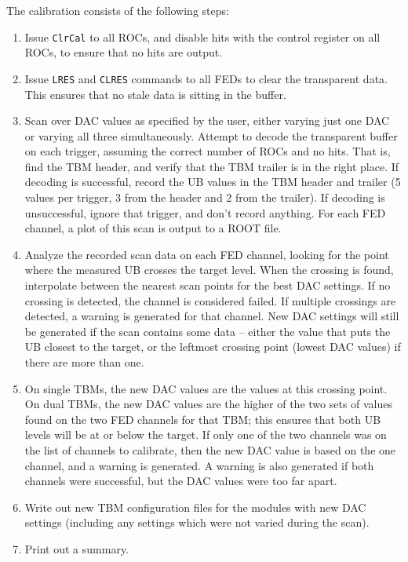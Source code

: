 The calibration consists of the following steps:
\begin{enumerate}
\item Issue \verb|ClrCal| to all ROCs, and disable hits with the control register on all ROCs, to ensure that no hits are output.
\item Issue \verb|LRES| and \verb|CLRES| commands to all FEDs to clear the transparent data.  This ensures that no stale data is sitting in the buffer.
\item Scan over DAC values as specified by the user, either varying just one DAC or varying all three simultaneously.  Attempt to decode the transparent buffer on each trigger, assuming the correct number of ROCs and no hits. That is, find the TBM header, and verify that the TBM trailer is in the right place.  If decoding is successful, record the UB values in the TBM header and trailer (5 values per trigger, 3 from the header and 2 from the trailer).  If decoding is unsuccessful, ignore that trigger, and don't record anything.  For each FED channel, a plot of this scan is output to a ROOT file.
\item Analyze the recorded scan data on each FED channel, looking for the point where the measured UB crosses the target level.  When the crossing is found, interpolate between the nearest scan points for the best DAC settings. If no crossing is detected, the channel is considered failed.  If multiple crossings are detected, a warning is generated for that channel.  New DAC settings will still be generated if the scan contains some data -- either the value that puts the UB closest to the target, or the leftmost crossing point (lowest DAC values) if there are more than one.
\item On single TBMs, the new DAC values are the values at this crossing point. On dual TBMs, the new DAC values are the higher of the two sets of values found on the two FED channels for that TBM; this ensures that both UB levels will be at or below the target.  If only one of the two channels was on the list of channels to calibrate, then the new DAC value is based on the one channel, and a warning is generated.  A warning is also generated if both channels were successful, but the DAC values were too far apart.
\item Write out new TBM configuration files for the modules with new DAC settings (including any settings which were not varied during the scan).
\item Print out a summary.
\end{enumerate}

